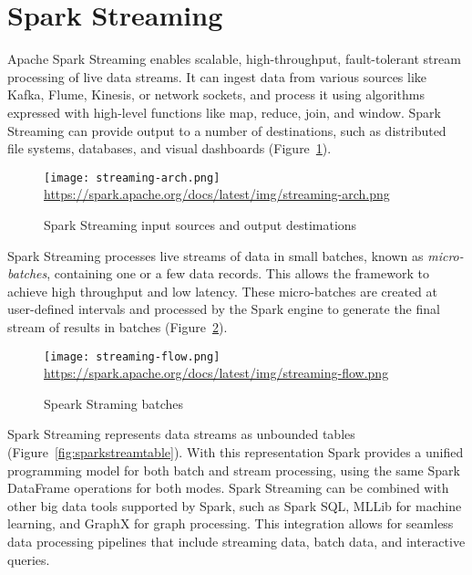 \FloatBarrier
\section{Spark Streaming}

Apache Spark Streaming enables scalable, high-throughput, fault-tolerant stream processing of live data streams. It can ingest data from various sources like Kafka, Flume, Kinesis, or network sockets, and process it using algorithms expressed with high-level functions like map, reduce, join, and window. Spark Streaming can provide output to a number of destinations, such as distributed file systems, databases, and visual dashboards (Figure~\ref{fig:sparkstreaming1}).

\begin{figure}
\centering

\texttt{[image: streaming-arch.png]} \\
\scriptsize\url{https://spark.apache.org/docs/latest/img/streaming-arch.png}\normalsize \\

\caption{Spark Streaming input sources and output destimations}
\label{fig:sparkstreaming1}
\end{figure}

Spark Streaming processes live streams of data in small batches, known as \emph{micro-batches}, containing one or a few data records. This allows the framework to achieve high throughput and low latency. These micro-batches are created at user-defined intervals and processed by the Spark engine to generate the final stream of results in batches (Figure~\ref{fig:sparkstreaming2}).

\begin{figure}
\centering

\texttt{[image: streaming-flow.png]}  \\

\scriptsize\url{https://spark.apache.org/docs/latest/img/streaming-flow.png}
\caption{Speark Straming batches}
\label{fig:sparkstreaming2}
\end{figure}

Spark Streaming represents data streams as unbounded tables (Figure~\ref{fig:sparkstreamtable}). With this representation Spark provides a unified programming model for both batch and stream processing, using the same Spark DataFrame operations for both modes. Spark Streaming can be combined with other big data tools supported by Spark, such as Spark SQL, MLLib for machine learning, and GraphX for graph processing. This integration allows for seamless data processing pipelines that include streaming data, batch data, and interactive queries.

